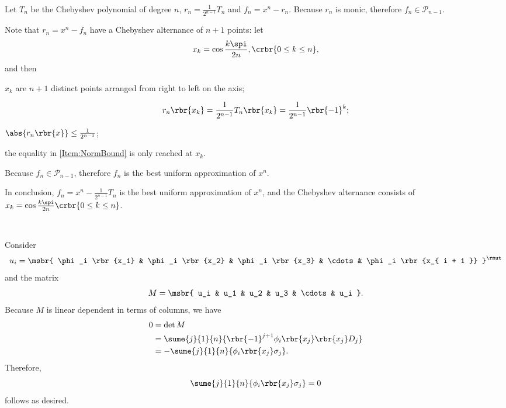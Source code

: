 \documentclass[english, nochinese]{../TeXTemplate/pkupaper}
\begin{document}
\begin{thmanswer}
\ 
\begin{thmquestion}
Let $T_n$ be the Chebyshev polynomial of degree $n$, $ r_n = \frac{1}{2^{ n - 1 }} T_n $ and $ f_n = x^n - r_n $. Because $r_n$ is monic, therefore $ f_n \in \mathcal{P}_{ n - 1 } $.

Note that $ r_n = x^n - f_n $ have a Chebyshev alternance of $ n + 1 $ points: let
\begin{equation}
x_k = \cos \frac{ k \spi }{ 2 n }, \crbr{ 0 \le k \le n },
\end{equation}
and then
\begin{partlist}
\item $x_k$ are $ n + 1 $ distinct points arranged from right to left on the axis;
\item
\begin{equation}
r_n \rbr{x_k} = \frac{1}{2^{ n - 1 }} T_n \rbr{x_k} = \frac{1}{2^{ n - 1 }} \rbr{-1}^k;
\end{equation}
\item $ \abs{ r_n \rbr{x} } \le \frac{1}{2^{ n - 1 }} $; \label{Item:NormBound}
\item the equality in \ref{Item:NormBound} is only reached at $x_k$.
\end{partlist}
Because $ f_n \in \mathcal{P}_{ n - 1 } $, therefore $f_n$ is the best uniform approximation of $x^n$.

In conclusion, $ f_n = x^n - \frac{1}{2^{ n - 1 }} T_n $ is the best uniform approximation of $x^n$, and the Chebyshev alternance consists of $ x_k = \cos \frac{ k \spi }{ 2 n } \crbr{ 0 \le k \le n } $.
\end{thmquestion}
\end{thmanswer}

\begin{thmquestion}
\
\begin{thmproof}
Consider
\begin{equation}
u_i = \msbr{ \phi_i \rbr{x_1} & \phi_i \rbr{x_2} & \phi_i \rbr{x_3} & \cdots & \phi_i \rbr{x_{ i + 1 }} }^{\rmut}
\end{equation}
and the matrix
\begin{equation}
M = \msbr{ u_i & u_1 & u_2 & u_3 & \cdots & u_i }.
\end{equation}
Because $M$ is linear dependent in terms of columns, we have
\begin{align}
0 &= \det M \\
&= \sume{j}{1}{n}{ \rbr{-1}^{ j + 1 } \phi_i \rbr{x_j} \rbr{x_j} D_j } \\
&= -\sume{j}{1}{n}{ \phi_i \rbr{x_j} \sigma_j }.
\end{align}
Therefore,
\begin{equation}
\sume{j}{1}{n}{ \phi_i \rbr{x_j} \sigma_j } = 0
\end{equation}
follows as desired.

\sqed
\end{thmproof}
\end{thmquestion}
\end{document}
